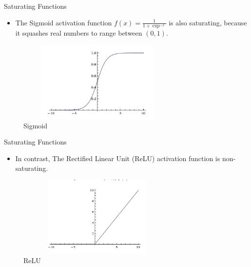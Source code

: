 \begin{frame}{Saturating Functions}
	\begin{itemize}
		\item The Sigmoid activation function  $f(x) = \frac{1}{1+\exp^{-x}}$ is also saturating, because it squashes real numbers to range between $(0, 1)$.
	\end{itemize}
	\begin{figure}
		\centering
		\includegraphics[width=8cm, height=4cm]{Figs/SIG.png}
		\caption{Sigmoid}
	\end{figure}
\end{frame}

\begin{frame}{Saturating Functions}
	\begin{itemize}
		\item In contrast, The Rectified Linear Unit (ReLU) activation function is non-saturating.
	\end{itemize}
	\begin{figure}
		\centering
		\includegraphics[width=8cm, height=4cm]{Figs/RELU.png}
		\caption{ReLU}
	\end{figure}
\end{frame}
